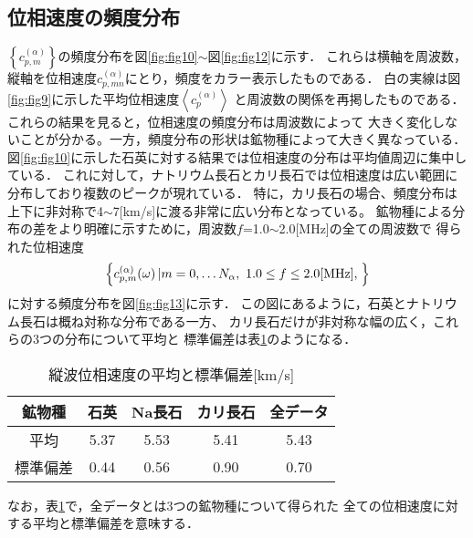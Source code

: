 \subsection{位相速度の頻度分布}
$\left\{ c^{(\alpha)}_{p,m}\right\}$の頻度分布を図\ref{fig:fig10}$\sim$図\ref{fig:fig12}に示す．
これらは横軸を周波数，縦軸を位相速度$c^{(\alpha)}_{p,mn}$にとり，頻度をカラー表示したものである．
白の実線は図\ref{fig:fig9}に示した平均位相速度$\left<c^{(\alpha)}_p\right>$
と周波数の関係を再掲したものである．これらの結果を見ると，位相速度の頻度分布は周波数によって
大きく変化しないことが分かる。一方，頻度分布の形状は鉱物種によって大きく異なっている．
図\ref{fig:fig10}に示した石英に対する結果では位相速度の分布は平均値周辺に集中している．
これに対して，ナトリウム長石とカリ長石では位相速度は広い範囲に分布しており複数のピークが現れている．
特に，カリ長石の場合、頻度分布は上下に非対称で4$\sim$7[km/s]に渡る非常に広い分布となっている。
鉱物種による分布の差をより明確に示すために，周波数$f$=1.0$\sim$2.0[MHz]の全ての周波数で
得られた位相速度
\[
	\left\{ c_{p,m}^{(\alpha)}(\omega)\left| m=0,\dots N_\alpha ,\ 1.0\leq f \leq 2.0[{\rm MHz}], \right.\right\}
\]
に対する頻度分布を図\ref{fig:fig13}に示す．
この図にあるように，石英とナトリウム長石は概ね対称な分布である一方、
カリ長石だけが非対称な幅の広く，これらの3つの分布について平均と
標準偏差は表\ref{tbl:tbl1}のようになる．
\begin{table}[htb]
	\caption{縦波位相速度の平均と標準偏差[km/s]}
  \begin{tabular}{c||c|c|c|c}
	  鉱物種 & 石英 & Na長石 & カリ長石 & 全データ\\
	  \hline
	  平均 & 5.37 & 5.53 & 5.41 & 5.43  \\
	  \hline
	  標準偏差 & 0.44 & 0.56 & 0.90 & 0.70  \\
  \end{tabular}
\label{tbl:tbl1}
\end{table}
なお，表\ref{tbl:tbl1}で，全データとは3つの鉱物種について得られた
全ての位相速度に対する平均と標準偏差を意味する．\\

